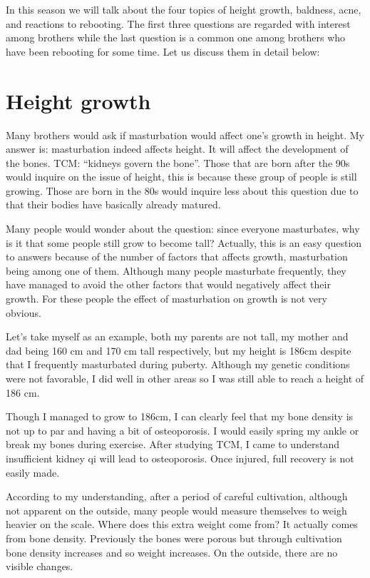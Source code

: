 \documentclass[
]{book}
\begin{document}
In this season we will talk about the four topics of height growth, baldness, acne, and reactions to rebooting. The first three questions are regarded with interest among brothers while the last question is a common one among brothers who have been rebooting for some time. Let us discuss them in detail below:

\hypertarget{height-growth}{%
\section{Height growth}\label{height-growth}}

Many brothers would ask if masturbation would affect one's growth in height. My answer is: masturbation indeed affects height. It will affect the development of the bones. TCM: ``kidneys govern the bone''. Those that are born after the 90s would inquire on the issue of height, this is because these group of people is still growing. Those are born in the 80s would inquire less about this question due to that their bodies have basically already matured.

Many people would wonder about the question: since everyone masturbates, why is it that some people still grow to become tall? Actually, this is an easy question to answers because of the number of factors that affects growth, masturbation being among one of them. Although many people masturbate frequently, they have managed to avoid the other factors that would negatively affect their growth. For these people the effect of masturbation on growth is not very obvious.

Let's take myself as an example, both my parents are not tall, my mother and dad being 160 cm and 170 cm tall respectively, but my height is 186cm despite that I frequently masturbated during puberty. Although my genetic conditions were not favorable, I did well in other areas so I was still able to reach a height of 186 cm.

Though I managed to grow to 186cm, I can clearly feel that my bone density is not up to par and having a bit of osteoporosis. I would easily spring my ankle or break my bones during exercise. After studying TCM, I came to understand insufficient kidney qi will lead to osteoporosis. Once injured, full recovery is not easily made.

According to my understanding, after a period of careful cultivation, although not apparent on the outside, many people would measure themselves to weigh heavier on the scale. Where does this extra weight come from? It actually comes from bone density. Previously the bones were porous but through cultivation bone density increases and so weight increases. On the outside, there are no visible changes.
\end{document}
